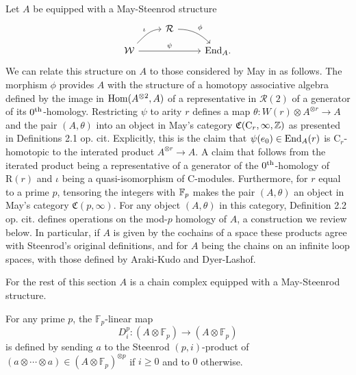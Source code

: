 Let $A$ be equipped with a May-Steenrod structure
\begin{equation*}
\begin{tikzcd}[column sep = normal, row sep = small]
& \mathcal R \arrow[dr, "\phi", out=0] & \\
\mathcal W \arrow[ur, "\iota", in=180] \arrow[rr, "\psi"] & & \End_A.
\end{tikzcd}
\end{equation*}
We can relate this structure on $A$ to those considered by May in \cite{may70generalapproach} as follows.
The morphism $\phi$ provides $A$ with the structure of a homotopy associative algebra defined by the image in $\mathrm{Hom}(A^{\otimes 2}, A)$ of a representative in $\mathcal R(2)$ of a generator of its $0^{\mathrm{th}}$-homology.
Restricting $\psi$ to arity $r$ defines a map $\theta \colon W(r) \otimes A^{\otimes r} \to A$ and the pair $(A, \theta)$ into an object in May's category $\mathfrak{C}(\mathrm C_r, \infty, \mathbb{Z})$ as presented in Definitions 2.1 op. cit.
Explicitly, this is the claim that $\psi(e_0) \in \mathrm{End}_A(r)$ is $\mathrm C_r$-homotopic to the interated product $A^{\otimes r} \to A$.
A claim that follows from the iterated product being a representative of a generator of the $0^{\mathrm{th}}$-homology of $\mathrm R(r)$ and $\iota$ being a quasi-isomorphism of $\mathrm C$-modules.
Furthermore, for $r$ equal to a prime $p$, tensoring the integers with $\mathbb{F}_p$ makes the pair $(A, \theta)$ an object in May's category $\mathfrak{C}(p, \infty)$.
For any object $(A, \theta)$ in this category, Definition 2.2 op. cit. defines operations on the mod-$p$ homology of $A$, a construction we review below.
In particular, if $A$ is given by the cochains of a space these products agree with Steenrod's original definitions, and for $A$ being the chains on an infinite loop spaces, with those defined by Araki-Kudo and Dyer-Lashof.

For the rest of this section $A$ is a chain complex equipped with a May-Steenrod structure.

\begin{definition}
	For any prime $p$, the $\mathbb{F}_p$-linear map
	\begin{equation*}
	D^p_i : (A \otimes \mathbb{F}_p) \to (A \otimes \mathbb{F}_p)
	\end{equation*}
	is defined by sending $a$ to the Steenrod \mbox{$(p, i)$-product} of $(a \otimes \cdots \otimes a) \in (A \otimes \mathbb{F}_p)^{\otimes p}$ if $i \geq 0$ and to $0$ otherwise.
\end{definition}

